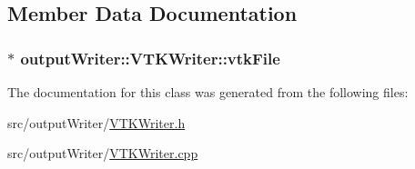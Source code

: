 \subsection{Member Data Documentation}
\subsubsection[{\texorpdfstring{vtk\+File}{vtkFile}}]{$\ast$ output\+Writer\+::\+V\+T\+K\+Writer\+::vtk\+File\hspace{0.3cm}{\ttfamily [private]}}\hypertarget{classoutputWriter_1_1VTKWriter_ab654ea4308b92e5dbdcd9a6833d5ed30}{}\label{classoutputWriter_1_1VTKWriter_ab654ea4308b92e5dbdcd9a6833d5ed30}


The documentation for this class was generated from the following files\+:\begin{DoxyCompactItemize}
\item 
src/output\+Writer/\hyperlink{VTKWriter_8h}{V\+T\+K\+Writer.\+h}\item 
src/output\+Writer/\hyperlink{VTKWriter_8cpp}{V\+T\+K\+Writer.\+cpp}\end{DoxyCompactItemize}
